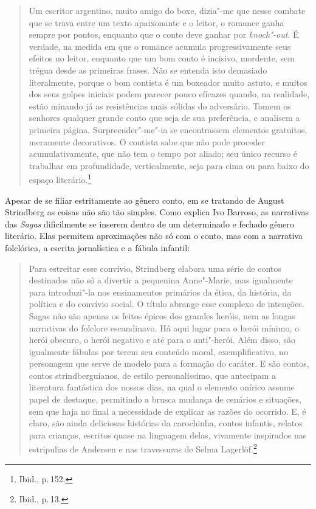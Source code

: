 \begin{quote}
Um escritor argentino, muito amigo do boxe, dizia"-me que nesse combate que se trava entre um texto apaixonante e o leitor, o romance ganha sempre por pontos, enquanto que o conto deve ganhar por \textit{knock"-out}. É verdade, na medida em que o romance acumula progressivamente seus efeitos no leitor, enquanto que um bom conto é incisivo, mordente, sem trégua desde as primeiras frases. Não se entenda isto demasiado literalmente, porque o bom contista é um boxeador muito astuto, e muitos dos seus golpes iniciais podem parecer pouco eficazes quando, na realidade, estão minando já as resistências mais sólidas do adversário.
Tomem os senhores qualquer grande conto que seja de sua preferência, e analisem a primeira página. Surpreender"-me"-ia se encontrassem elementos gratuitos, meramente decorativos. O contista sabe que não pode proceder acumulativamente, que não tem o tempo por aliado; seu único recurso é trabalhar em profundidade, verticalmente, seja para cima ou para baixo do espaço literário.\footnote{Ibid., p.\,152.}
\end{quote}

Apesar de se filiar estritamente ao gênero conto, em se tratando de August Strindberg as coisas não são tão simples. Como explica Ivo Barroso, as narrativas das \textit{Sagas}
dificilmente se inserem dentro de um determinado e fechado gênero literário. Elas permitem aproximações não só com o conto, mas com a narrativa folclórica, a escrita jornalística e a fábula infantil:

\begin{quote}
Para estreitar esse convívio, Strindberg elabora uma série de contos
destinados não só a divertir a pequenina Anne"-Marie, mas igualmente
para introduzi"-la nos ensinamentos primários da ética, da história,
da política e do convívio social. O título abrange esse complexo de
intenções. Sagas não são apenas os feitos épicos dos grandes heróis,
nem as longas narrativas do folclore escandinavo. Há aqui lugar para o
herói mínimo, o herói obscuro, o herói negativo e até para o
anti"-herói. Além disso, são igualmente fábulas por terem seu conteúdo
moral, exemplificativo, no personagem que serve de modelo para a
formação do caráter. E são contos, contos strindberguianos, de estilo
personalíssimo, que antecipam a literatura fantástica dos nossos dias,
na qual o elemento onírico assume papel de destaque, permitindo a
brusca mudança de cenários e situações, sem que haja no final a
necessidade de explicar as razões do ocorrido. E, é claro, são ainda
deliciosas histórias da carochinha, contos infantis, relatos para
crianças, escritos quase na linguagem delas, vivamente inspirados nas
estripulias de Andersen e nas travessuras de Selma Lagerlöf.\footnote{Ibid., p.\,13.}
\end{quote}


